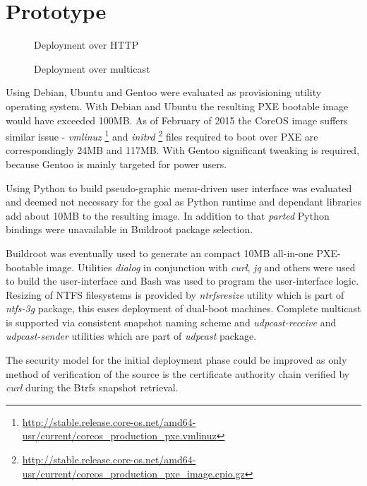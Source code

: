 \documentclass{article}
\begin{document}
\chapter{Prototype}


\begin{figure}[!htb]
\centering
\scalebox{0.5}{}
\caption{Deployment over HTTP}
\label{fig:butterknife-usercase-http}
\end{figure}


\begin{figure}[!htb]
\centering
\scalebox{0.5}{}
\caption{Deployment over multicast}
\label{fig:butterknife-usecase-multicast}
\end{figure}


Using Debian, Ubuntu and Gentoo were evaluated as provisioning utility
operating system. With Debian and Ubuntu the resulting PXE bootable image
would have exceeded 100MB.
As of February of 2015 the CoreOS image suffers similar issue -
\emph{vmlinuz}
\footnote{\url{http://stable.release.core-os.net/amd64-usr/current/coreos_production_pxe.vmlinuz}}
and
\emph{initrd}
\footnote{\url{http://stable.release.core-os.net/amd64-usr/current/coreos_production_pxe_image.cpio.gz}}
files required to boot over PXE are correspondingly 24MB and 117MB.
With Gentoo significant tweaking is required, because Gentoo is
mainly targeted for power users.

Using Python to build pseudo-graphic menu-driven user interface was
evaluated and deemed not necessary for the goal as Python runtime and
dependant libraries add about 10MB to the resulting image.
In addition to that \emph{parted} Python bindings were unavailable
in Buildroot package selection.

Buildroot was eventually used to generate an compact 10MB all-in-one
PXE-bootable image. Utilities \emph{dialog} in conjunction with
\emph{curl}, \emph{jq} and others were used to build the user-interface
and Bash was used to program the user-interface logic.
Resizing of NTFS filesystems is provided by \emph{ntrfsresize} utility
which is part of \emph{ntfs-3g} package, this eases deployment of
dual-boot machines.
Complete multicast is supported via consistent snapshot naming scheme
and \emph{udpcast-receive} and \emph{udpcast-sender} utilities which
are part of \emph{udpcast} package.

The security model for the initial deployment phase could be improved
as only method of verification of the source is the certificate
authority chain verified by \emph{curl} during the Btrfs snapshot
retrieval.
\end{document}
